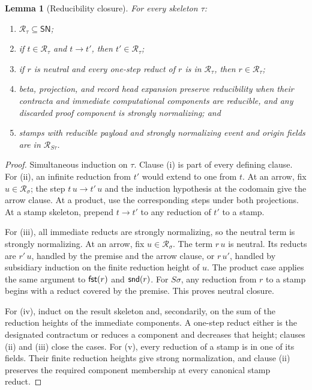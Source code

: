 \documentclass[11pt]{article}
\numberwithin{equation}{section}
\theoremstyle{definition}
\theoremstyle{plain}
\newtheorem{lemma}[definition]{Lemma}
\theoremstyle{remark}
\newcommand{\fst}{\AFFst}
\newcommand{\snd}{\AFSnd}
\begin{document}
\begin{lemma}[Reducibility closure]\label{lem:candidate-closure}
For every skeleton \(\tau\):
\begin{enumerate}[label=(\roman*),leftmargin=2.5em]
\item \(\mathcal R_\tau\subseteq\mathsf{SN}\);
\item if \(t\in\mathcal R_\tau\) and \(t\longrightarrow t'\), then
\(t'\in\mathcal R_\tau\);
\item if \(r\) is neutral and every one-step reduct of \(r\) is in
\(\mathcal R_\tau\), then \(r\in\mathcal R_\tau\);
\item beta, projection, and record head expansion preserve reducibility when
their contracta and immediate computational components are reducible, and any
discarded proof component is strongly normalizing; and
\item stamps with reducible payload and strongly normalizing event and origin
fields are in \(\mathcal R_{S\tau}\).
\end{enumerate}
\end{lemma}

\begin{proof}
Simultaneous induction on \(\tau\).  Clause (i) is part of every defining
clause.  For (ii), an infinite reduction from \(t'\) would extend to one from
\(t\).  At an arrow, fix \(u\in\mathcal R_\sigma\); the step
\(t\,u\longrightarrow t'\,u\) and the induction hypothesis at the codomain
give the arrow clause.  At a product, use the corresponding steps under both
projections.  At a stamp skeleton, prepend \(t\longrightarrow t'\) to any
reduction of \(t'\) to a stamp.

For (iii), all immediate reducts are strongly normalizing, so the neutral
term is strongly normalizing.  At an arrow, fix
\(u\in\mathcal R_\sigma\).  The term \(r\,u\) is neutral.  Its reducts are
\(r'\,u\), handled by the premise and the arrow clause, or \(r\,u'\),
handled by subsidiary induction on the finite reduction height of \(u\).
The product case applies the same argument to \(\fst(r)\) and \(\snd(r)\).
For \(S\sigma\), any reduction from \(r\) to a stamp begins with a reduct
covered by the premise.  This proves neutral closure.

For (iv), induct on the result skeleton and, secondarily, on the sum of the
reduction heights of the immediate components.  A one-step reduct either is
the designated contractum or reduces a component and decreases that height;
clauses (ii) and (iii) close the cases.  For (v), every reduction of a stamp
is in one of its fields.  Their finite reduction heights give strong
normalization, and clause (ii) preserves the required component membership
at every canonical stamp reduct.
\end{proof}
\end{document}
